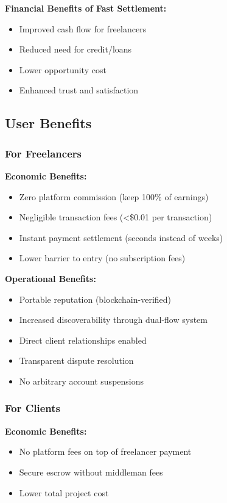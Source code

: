 \documentclass[a4paper,13pt,twoside]{report}
\theoremstyle{definition}
\begin{document}
\textbf{Financial Benefits of Fast Settlement:}
\begin{itemize}
    \item Improved cash flow for freelancers
    \item Reduced need for credit/loans
    \item Lower opportunity cost
    \item Enhanced trust and satisfaction
\end{itemize}

\subsection{User Benefits}

\subsubsection{For Freelancers}

\textbf{Economic Benefits:}
\begin{itemize}
    \item Zero platform commission (keep 100\% of earnings)
    \item Negligible transaction fees (<\$0.01 per transaction)
    \item Instant payment settlement (seconds instead of weeks)
    \item Lower barrier to entry (no subscription fees)
\end{itemize}

\textbf{Operational Benefits:}
\begin{itemize}
    \item Portable reputation (blockchain-verified)
    \item Increased discoverability through dual-flow system
    \item Direct client relationships enabled
    \item Transparent dispute resolution
    \item No arbitrary account suspensions
\end{itemize}

\subsubsection{For Clients}

\textbf{Economic Benefits:}
\begin{itemize}
    \item No platform fees on top of freelancer payment
    \item Secure escrow without middleman fees
    \item Lower total project cost
\end{itemize}
\end{document}
